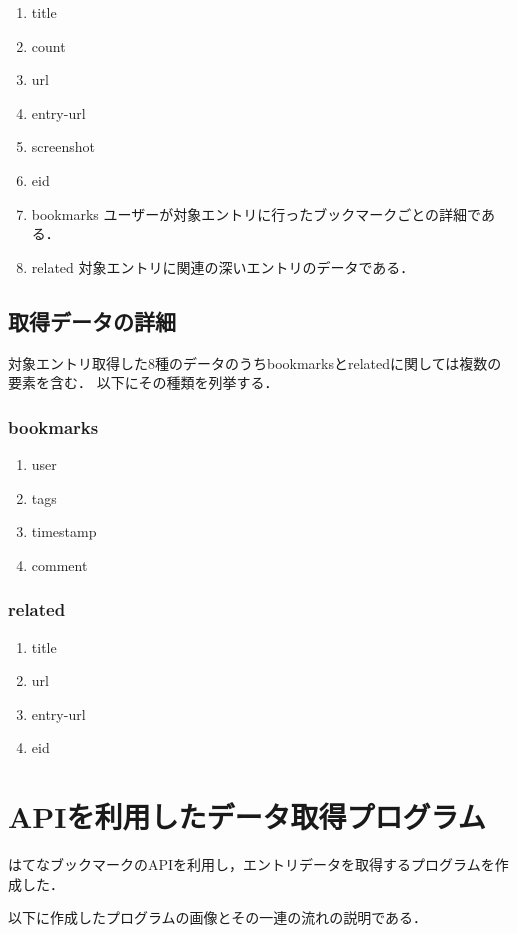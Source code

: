 \begin{enumerate}
\item title
\item count 
\item url
\item entry-url
\item screenshot
\item eid 
\item bookmarks ユーザーが対象エントリに行ったブックマークごとの詳細である．
\item related 対象エントリに関連の深いエントリのデータである．
\end{enumerate}

\subsection{取得データの詳細}
対象エントリ取得した8種のデータのうちbookmarksとrelatedに関しては複数の要素を含む．
以下にその種類を列挙する．

\subsubsection{bookmarks}

\begin{enumerate}
\item user 
\item tags
\item timestamp 
\item comment
\end{enumerate}

\subsubsection{related}

\begin{enumerate}
\item title
\item url
\item entry-url
\item eid
\end{enumerate}

\newpage

\section{APIを利用したデータ取得プログラム}
はてなブックマークのAPIを利用し，エントリデータを取得するプログラムを作成した．\par
以下に作成したプログラムの画像とその一連の流れの説明である．

